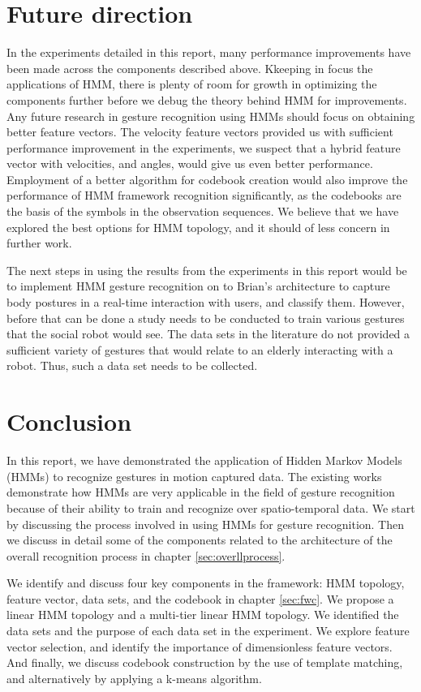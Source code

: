 \documentclass[]{report}   %
\begin{document}
\chapter{Future direction}
In the experiments detailed in this report, many performance improvements have been made across the components described above. Kkeeping in focus the applications of HMM, there is plenty of room for growth in optimizing the components further before we debug the theory behind HMM for improvements. Any future research in gesture recognition using HMMs should focus on obtaining better feature vectors. The velocity feature vectors provided us with sufficient performance improvement in the experiments, we suspect that a hybrid feature vector with velocities, and angles, would give us even better performance. Employment of a better algorithm for codebook creation would also improve the performance of HMM framework recognition significantly, as the codebooks are the basis of the symbols in the observation sequences. We believe that we have explored the best options for HMM topology, and it should of less concern in further work.

The next steps in using the results from the experiments in this report would be to implement HMM gesture recognition on to Brian's\cite{dmcoll} architecture to capture body postures in a real-time interaction with users, and classify them. However, before that can be done a study needs to be conducted to train various gestures that the social robot would see. The data sets in the literature do not provided a sufficient variety of gestures that would relate to an elderly interacting with a robot. Thus, such a data set needs to be collected.

\chapter{Conclusion}\label{sec:conclusion}
In this report, we have demonstrated the application of Hidden Markov Models (HMMs) to recognize gestures in motion captured data. The existing works demonstrate how HMMs are very applicable in the field of gesture recognition because of their ability to train and recognize over spatio-temporal data. We start by discussing the process involved in using HMMs for gesture recognition. Then we discuss in detail some of the components related to the architecture of the overall recognition process in chapter \ref{sec:overllprocess}. 

We identify and discuss four key components in the framework: HMM topology, feature vector, data sets, and the codebook in chapter \ref{sec:fwc}. We propose a linear HMM topology and a multi-tier linear HMM topology. We identified the data sets and the purpose of each data set in the experiment. We explore feature vector selection, and identify the importance of dimensionless feature vectors. And finally, we discuss codebook construction by the use of template matching, and alternatively by applying a k-means algorithm.
\end{document}
